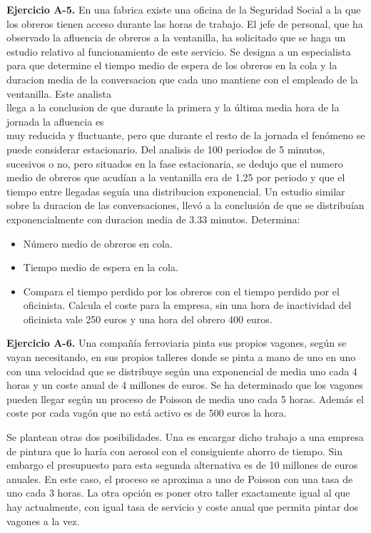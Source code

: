 \documentclass[
]{book}
\providecommand{\tightlist}{%
  \setlength{\itemsep}{0pt}\setlength{\parskip}{0pt}}
\theoremstyle{definition}
\theoremstyle{definition}
\theoremstyle{definition}
\theoremstyle{definition}
\theoremstyle{remark}
\begin{document}
\textbf{Ejercicio A-5.} En una fabrica existe una oficina de la Seguridad Social a la que los obreros tienen acceso durante las horas de trabajo. El jefe de personal, que ha observado la afluencia de obreros a la ventanilla, ha solicitado que se haga un estudio relativo al funcionamiento de este servicio. Se designa a un especialista para que determine el tiempo medio de espera de los obreros en la cola y la duracion
media de la conversacion que cada uno mantiene con el empleado de la ventanilla. Este analista\\
llega a la conclusion de que durante la primera y la última media hora de la jornada la afluencia es\\
muy reducida y fluctuante, pero que durante el resto de la jornada el fenómeno se puede considerar
estacionario. Del analisis de 100 periodos de 5 minutos, sucesivos o no, pero situados en la fase
estacionaria, se dedujo que el numero medio de obreros que acudían a la ventanilla era de 1.25 por
periodo y que el tiempo entre llegadas seguía una distribucion exponencial. Un estudio similar sobre
la duracion de las conversaciones, llevó a la conclusión de que se distribuían exponencialmente con
duracion media de 3.33 minutos. Determina:

\begin{itemize}
\tightlist
\item
  Número medio de obreros en cola.
\item
  Tiempo medio de espera en la cola.
\item
  Compara el tiempo perdido por los obreros con el tiempo perdido por el oficinista. Calcula el coste para la empresa, sin una hora de inactividad del oficinista vale 250 euros y una hora del obrero 400 euros.
\end{itemize}

\textbf{Ejercicio A-6.} Una compañía ferroviaria pinta sus propios vagones, según se vayan necesitando, en sus propios talleres donde se pinta a mano de uno en uno con una velocidad que se distribuye según una exponencial de media uno cada 4 horas y un coste anual de 4 millones de euros. Se ha determinado que los vagones pueden llegar según un proceso de Poisson de media uno cada 5 horas. Además el coste por cada vagón que no está activo es de 500 euros la hora.

Se plantean otras dos posibilidades. Una es encargar dicho trabajo a una empresa de pintura que lo haría con aerosol con el consiguiente ahorro de tiempo. Sin embargo el presupuesto para esta segunda alternativa es de 10 millones de euros anuales. En este caso, el proceso se aproxima a uno de Poisson con una tasa de uno cada 3 horas. La otra opción es poner otro taller exactamente igual al que hay actualmente, con igual tasa de servicio y coste anual que permita pintar dos vagones a la vez.
\end{document}
